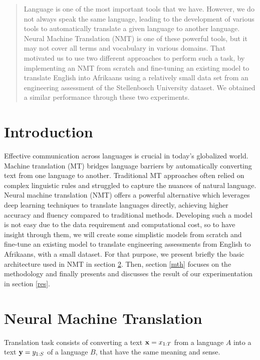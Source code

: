 \begin{abstract}
	Language is one of the most important tools that we have. However, we do not always speak the same language, leading to the development of various tools to automatically translate a given language to another language. Neural Machine Translation (NMT) is one of these powerful tools, but it may not cover all terms and vocabulary in various domains. That motivated us to use two different approaches to perform such a task, by implementing an NMT from scratch and fine-tuning an existing model to translate English into Afrikaans using a relatively small data set from an engineering assessment of the Stellenbosch University dataset. We obtained a similar performance through these two experiments.
\end{abstract}

\section{Introduction}
Effective communication across languages is crucial in today's globalized world. Machine translation (MT) bridges language barriers by automatically converting text from one language to another. Traditional MT approaches often relied on complex linguistic rules and struggled to capture the nuances of natural language. Neural machine translation (NMT) offers a powerful alternative which leverages deep learning techniques to translate languages directly, achieving higher accuracy and fluency compared to traditional methods. Developing such a model is not easy due to the data requirement and computational cost, so to have insight through them, we will create some simplistic models from scratch and fine-tune an existing model to translate engineering assessments from English to Afrikaans, with a small dataset. For that purpose, we present briefly the basic architecture used in NMT in section \ref{nmt}.  Then, section \ref{mth} focuses on the methodology and finally presents and discusses the result of our experimentation in section \ref{res}.

\section{Neural Machine Translation}\label{nmt}
Translation task consists of converting a text $\mathbf{x}=x_{1:T}$ from a language $A$ into a text $\mathbf{y}=y_{1:S}$ of a language $B$, that have the same meaning and sense.

